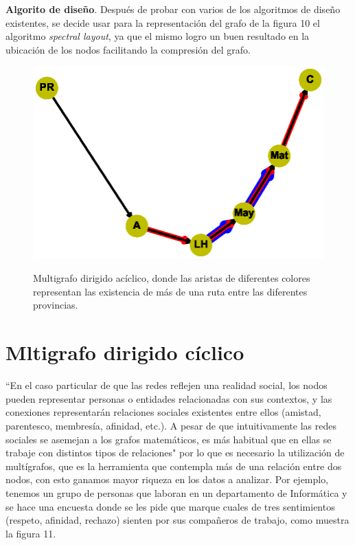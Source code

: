 \documentclass{article}
\begin{document}
\textbf{Algorito de diseño}.
Después de probar con varios de los algoritmos de diseño existentes, se decide usar para la representación del grafo de la figura 10 el algoritmo \textit{spectral layout}, ya que el mismo logro un buen resultado en la ubicación de los nodos facilitando la compresión del grafo.
\begin{center}

\end{center}
\begin{figure}[h]
\begin{center}
\includegraphics[scale=0.7]{Graf10_spectral_layout.eps}\\
\caption{Multigrafo dirigido acíclico, donde las aristas de diferentes colores representan las existencia de más de una ruta entre las diferentes provincias.}
\end{center}
\end{figure}
\newpage
\section{Mltigrafo dirigido cíclico}
“En el caso particular de que las redes reflejen una realidad social, los nodos pueden representar personas o entidades relacionadas con sus contextos, y las conexiones representarán relaciones sociales existentes entre ellos (amistad, parentesco, membresía, afinidad, etc.). A pesar de que intuitivamente las redes sociales se asemejan a los grafos matemáticos, es más habitual que en ellas se trabaje con distintos tipos de relaciones"\cite{gf3} por lo que es necesario la utilización de multígrafos, que es la herramienta que contempla más de una relación entre dos nodos, con esto ganamos mayor riqueza en los datos a analizar. 
Por ejemplo, tenemos un grupo de personas que laboran en un departamento de Informática y se hace una encuesta donde se les pide que marque cuales de tres sentimientos (respeto, afinidad, rechazo) sienten por sus compañeros de trabajo, como muestra la figura 11.
\end{document}
